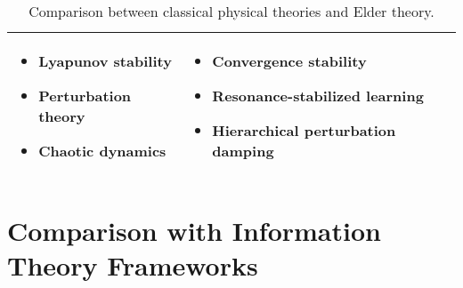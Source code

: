 \begin{table}[h]
\begin{tabular}{|p{3cm}|p{5cm}|p{5cm}|}
\begin{itemize}
    \item Lyapunov stability
    \item Perturbation theory
    \item Chaotic dynamics
\end{itemize} &
\begin{itemize}
    \item Convergence stability
    \item Resonance-stabilized learning
    \item Hierarchical perturbation damping
\end{itemize} \\
\hline
\end{tabular}
\caption{Comparison between classical physical theories and Elder theory.}
\label{tab:physics_comparison}
\end{table}

\section{Comparison with Information Theory Frameworks}

